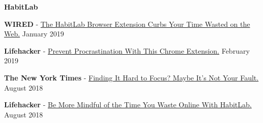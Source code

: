 
\textcolor{sectcol}{\textbf{HabitLab}}

\textbf{WIRED} - \href{https://www.wired.com/story/habitlab-browser-extension/}{The HabitLab Browser Extension Curbs Your Time Wasted on the Web.} \hfill January 2019


\textbf{Lifehacker} - \href{https://lifehacker.com/prevent-procrastination-with-this-chrome-extension-1832723418}{Prevent Procrastination With This Chrome Extension.} \hfill February 2019


\textbf{The New York Times} - \href{https://www.nytimes.com/2018/08/14/style/how-can-i-focus-better.html}{Finding It Hard to Focus? Maybe It’s Not Your Fault.} \hfill August 2018



\textbf{Lifehacker} - \href{https://lifehacker.com/be-more-mindful-of-the-time-you-waste-online-with-habit-1828118354}{Be More Mindful of the Time You Waste Online With HabitLab.} \hfill August 2018



